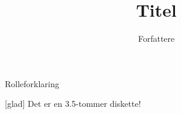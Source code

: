\documentclass[a4paper,11pt]{article}
\title{Titel}
\author{Forfattere}
\begin{document}
\maketitle

\begin{roles}
 Rolleforklaring
\end{roles}

\begin{sketch}

[glad] Det er en 3.5-tommer diskette!

\end{sketch}
\end{document}
